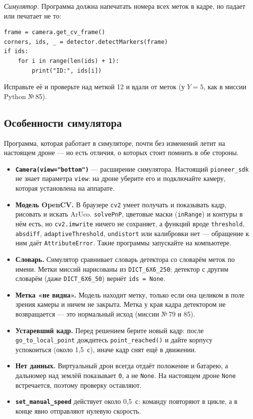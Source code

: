 \begin{taskbox}
\emph{Симулятор.} Программа должна напечатать номера всех меток в кадре, но падает или печатает не то:
\begin{verbatim}
frame = camera.get_cv_frame()
corners, ids, _ = detector.detectMarkers(frame)
if ids:
    for i in range(len(ids) + 1):
        print("ID:", ids[i])
\end{verbatim}
Исправьте её и проверьте над меткой 12 и вдали от меток (у $Y = 5$, как в миссии Python №\,85).
\end{taskbox}

\subsection{Особенности симулятора}
Программа, которая работает в симуляторе, почти без изменений летит на настоящем дроне --- но есть отличия, о которых стоит помнить в обе стороны.
\begin{itemize}
    \item \textbf{\texttt{Camera(view="bottom")}} --- расширение симулятора. Настоящий \texttt{pioneer\_sdk} не знает параметра \texttt{view}: на дроне уберите его и подключайте камеру, которая установлена на аппарате.
    \item \textbf{Модель OpenCV.} В браузере \texttt{cv2} умеет получать и показывать кадр, рисовать и искать ArUco. \texttt{solvePnP}, цветовые маски (\texttt{inRange}) и контуры в нём есть, но \texttt{cv2.imwrite} ничего не сохраняет, а функций вроде \texttt{threshold}, \texttt{absdiff}, \texttt{adaptiveThreshold}, \texttt{undistort} или калибровки нет --- обращение к ним даёт \texttt{AttributeError}. Такие программы запускайте на компьютере.
    \item \textbf{Словарь.} Симулятор сравнивает словарь детектора со словарём меток по имени. Метки миссий нарисованы из \texttt{DICT\_6X6\_250}; детектор с другим словарём (даже \texttt{DICT\_6X6\_50}) вернёт \texttt{ids = None}.
    \item \textbf{Метка «не видна».} Модель находит метку, только если она целиком в поле зрения камеры и ничем не закрыта. Метка у края кадра детектором не возвращается --- это нормальный исход (миссии №\,79 и 85).
    \item \textbf{Устаревший кадр.} Перед решением берите новый кадр: после \texttt{go\_to\_local\_point} дождитесь \texttt{point\_reached()} и дайте корпусу успокоиться (около 1,5~с), иначе кадр снят ещё в движении.
    \item \textbf{Нет данных.} Виртуальный дрон всегда отдаёт положение и батарею, а дальномер над землёй показывает \texttt{0}, а не \texttt{None}. На настоящем дроне \texttt{None} встречается, поэтому проверку оставляют.
    \item \textbf{\texttt{set\_manual\_speed}} действует около 0,5~с: команду повторяют в цикле, а в конце явно отправляют нулевую скорость.
\end{itemize}


